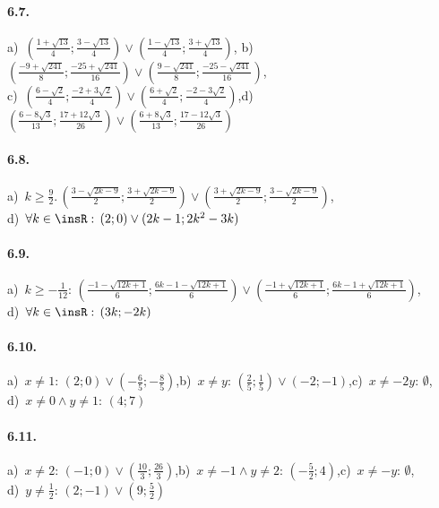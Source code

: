 \paragraph{6.7.} a)~\(\left(\frac{1+\sqrt{13}} 4;\frac{3-\sqrt{13}} 4\right)\vee \left(\frac{1-\sqrt{13}} 4;\frac{3+\sqrt{13}} 4\right)\),\; b)~\(\left(\frac{-9+\sqrt{241}} 8;\frac{-25+\sqrt{241}}{16}\right)\vee \left(\frac{9-\sqrt{241}} 8;\frac{-25-\sqrt{241}}{16}\right)\),\protect\\
c)~\(\left(\frac{6-\sqrt 2} 4;\frac{-2+3\sqrt 2} 4\right)\vee \left(\frac{6+\sqrt 2} 4;\frac{-2-3\sqrt 2} 4\right)\),\quad d)~\(\left(\frac{6-8\sqrt 3}{13};\frac{17+12\sqrt 3}{26}\right)\vee\left(\frac{6+ 8\sqrt 3}{13};\frac{17-12\sqrt 3}{26}\right)\)

\paragraph{6.8.} a)~\(k\ge \frac 9 2.\, \left(\frac{3-\sqrt{2k-9}} 2; \frac{3+\sqrt{2k-9}} 2\right)\vee \left(\frac{3+\sqrt{2k-9}} 2; \frac{3-\sqrt{2k-9}} 2\right)\),\protect\\
\quad d)~\(\forall k\in \insR:\, (2; 0)\vee (2k-1; 2k^2-3k)\)

\paragraph{6.9.} a)~\(k\ge -\frac 1{12}:\, \left(\frac{-1-\sqrt{12k+1}} 6; \frac{6k-1-\sqrt{12k+1}} 6\right) \vee \left(\frac{-1+\sqrt{12k+1}} 6; \frac{6k-1+\sqrt{12k+1}} 6\right)\),\protect\\
\quad d)~\(\forall k\in \insR:\, (3k; -2k)\)

\paragraph{6.10.} a)~\(x\neq 1:\, \left(2;0\right)\vee \left(-\frac 6 5;-\frac 8 5\right)\),\quad b)~\(x\neq y:\, \left(\frac 2 5;\frac 1 5\right)\vee \left(-2;-1\right)\),\quad c)~\(x\neq -2y:\, \emptyset \),\protect\\
\quad d)~\(x\neq 0\wedge y\neq 1:\, (4;7)\)

\paragraph{6.11.} a)~\(x\neq 2:\, \left(-1;0\right)\vee \left(\frac{10} 3;\frac{26} 3\right)\),\quad b)~\(x\neq -1\wedge y\neq 2:\, \left(-\frac 5 2;4\right)\),\quad c)~\(x\neq -y:\, \emptyset \),\protect\\
\quad d)~\(y\neq \frac 1 2:\, \left(2;-1\right)\vee \left(9;\frac 5 2\right)\)


